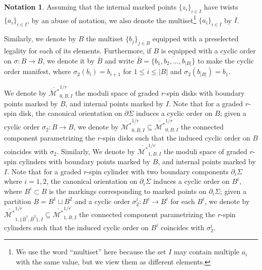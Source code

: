 \documentclass[11pt]{amsart}
\theoremstyle{definition}
\newtheorem{nn}[dummy]{Notation}
\theoremstyle{remark}
\newcommand{\<}{\left<}
\renewcommand{\>}{\right>}
\numberwithin{equation}{section}
\def\Mbarstar{{\overline{\mathcal M^*}}}
\begin{document}
\begin{nn}
    Assuming that the internal marked points $\{z_i\}_{i\in I}$ have twists $\{a_i\}_{i\in I}$, by an abuse of notation, we also denote %
the multiset\footnote{We use the word ``multiset'' here because the set $I$ may contain multiple $a_i$ with the same value, but we view them as different elements.} $\{a_i\}_{i\in I}$ %
by $I$.
    
Similarly, we denote by $B$ the multiset $\{b_j\}_{j\in B}$ equipped with a preselected legality for each of its elements. Furthermore, if $B$ is equipped with a cyclic order on $\sigma\colon B\to B$, we denote it by $\bar B$ and write $\bar{B}=\overline{\{b_1,b_2,\dots,b_{\lvert B \rvert}\}}$ to make the cyclic order manifest, where $\sigma_2(b_i)=b_{i+1}$ for $1\le i \le \lvert B \rvert$ and $\sigma_2(b_{\lvert B \rvert})=b_{1}$.
\end{nn}



We denote by $\Mbarstar_{0,B,I}^{1/r}$ the moduli space of graded $r$-spin disks with boundary points marked by $B$, and internal points marked by $I$. Note that for a graded $r$-spin disk, the canonical orientation on $\partial\Sigma$ induces a cyclic order on $B$; given a cyclic order $\sigma_2\colon B \to B$, we denote by $\Mbarstar_{0,\bar{B},I}^{1/r}\subseteq \Mbarstar_{0,{B},I}^{1/r}$ the connected component parametrizing the $r$-spin disks such that the induced cyclic order on $B$ coincides with $\sigma_2$. 
Similarly, We denote by $\Mbarstar_{1,B,I}^{1/r}$ the moduli space of graded $r$-spin cylinders with boundary points marked by $B$, and internal points marked by $I$. Note that for a graded $r$-spin cylinder with two boundary components $\partial_i\Sigma$ where $i=1,2$, the canonical orientation on $\partial_i\Sigma$ induces a cyclic order on $B^i$, where $B^i\subset B$ is the markings corresponding to marked points on $\partial_i\Sigma$; given a partition %
$B=B^1\sqcup B^2$ and %
a cyclic order $\sigma_2^i\colon B^i \to B^i$ for each $B^i$, we denote by $\Mbarstar_{1,\{\bar{B}^1,\bar B^2\},I}^{1/r}\subseteq \Mbarstar_{1,{B},I}^{1/r}$ the connected component parametrizing the $r$-spin cylinders such that the induced cyclic order on $B^i$ coincides with $\sigma^i_2$. 
\end{document}
